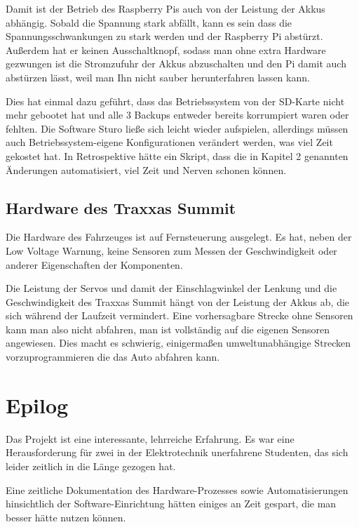 \documentclass[a4paper,10pt]{scrartcl}
\begin{document}
    Damit ist der Betrieb des Raspberry Pis auch von der Leistung der Akkus
    abhängig.
    Sobald die Spannung stark abfällt, kann es sein dass die
    Spannungsschwankungen zu stark werden und der Raspberry Pi abstürzt.
    Außerdem hat er keinen Ausschaltknopf, sodass man ohne extra Hardware
    gezwungen ist die Stromzufuhr der Akkus abzuschalten und den Pi damit auch
    abstürzen lässt, weil man Ihn nicht sauber herunterfahren lassen kann.

    Dies hat einmal dazu geführt, dass das Betriebssystem von der SD-Karte nicht
    mehr gebootet hat und alle 3 Backups entweder bereits korrumpiert waren
    oder fehlten.
    Die Software Sturo ließe sich leicht wieder aufspielen, allerdings müssen
    auch Betriebssystem-eigene Konfigurationen verändert werden, was viel Zeit
    gekostet hat.
    In Retrospektive hätte ein Skript, dass die in Kapitel 2 genannten
    Änderungen automatisiert, viel Zeit und Nerven schonen können.

  \subsection{Hardware des Traxxas Summit}

    Die Hardware des Fahrzeuges ist auf Fernsteuerung ausgelegt.
    Es hat, neben der Low Voltage Warnung, keine Sensoren zum Messen der
    Geschwindigkeit oder anderer Eigenschaften der Komponenten.

    Die Leistung der Servos und damit der Einschlagwinkel der Lenkung und die
    Geschwindigkeit des Traxxas Summit hängt von der Leistung der Akkus ab,
    die sich während der Laufzeit vermindert.
    Eine vorhersagbare Strecke ohne Sensoren kann man also nicht abfahren, man
    ist vollständig auf die eigenen Sensoren angewiesen.
    Dies macht es schwierig, einigermaßen umweltunabhängige Strecken
    vorzuprogrammieren die das Auto abfahren kann.

  \section{Epilog}

    Das Projekt ist eine interessante, lehrreiche Erfahrung.
    Es war eine Herausforderung für zwei in der Elektrotechnik unerfahrene
    Studenten, das sich leider zeitlich in die Länge gezogen hat.

    Eine zeitliche Dokumentation des Hardware-Prozesses sowie Automatisierungen
    hinsichtlich der Software-Einrichtung hätten einiges an Zeit gespart, die
    man besser hätte nutzen können.
\end{document}
